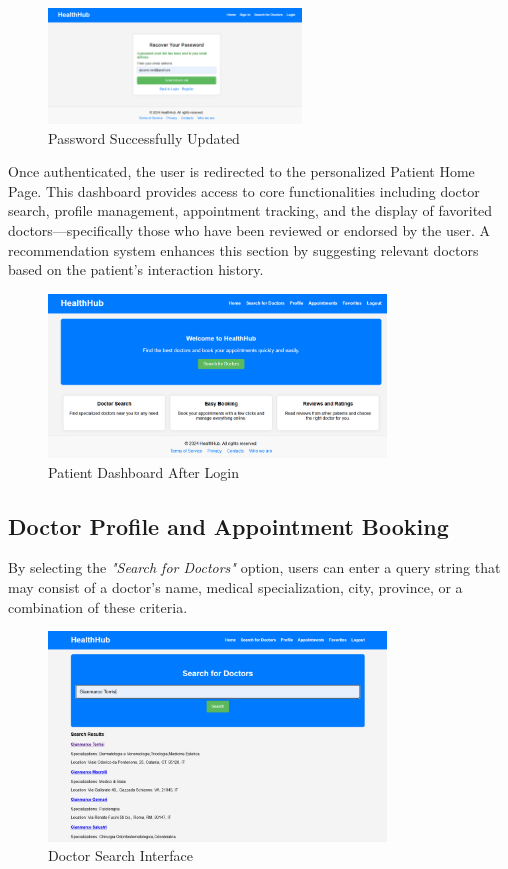 \begin{figure}[H]
	\centering
	\includegraphics[width=0.6\textwidth]{resources/recover3.png}
	\caption{Password Successfully Updated}
	\label{fig:recover3}
\end{figure}

Once authenticated, the user is redirected to the personalized Patient Home Page. This dashboard provides access to core functionalities including doctor search, profile management, appointment tracking, and the display of favorited doctors—specifically those who have been reviewed or endorsed by the user. A recommendation system enhances this section by suggesting relevant doctors based on the patient's interaction history.

\begin{figure}[H]
	\centering
	\includegraphics[width=0.8\textwidth]{resources/logged-patient.png}
	\caption{Patient Dashboard After Login}
	\label{fig:logged-patient}
\end{figure}

\subsection{Doctor Profile and Appointment Booking}
By selecting the \textit{"Search for Doctors"} option, users can enter a query string that may consist of a doctor's name, medical specialization, city, province, or a combination of these criteria.

\begin{figure}[H]
	\centering
	\includegraphics[width=0.8\textwidth]{resources/search-doctor.png}
	\caption{Doctor Search Interface}
	\label{fig:search-doctor}
\end{figure}

